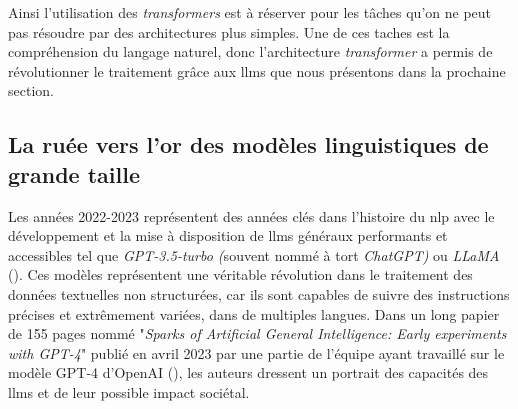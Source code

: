 Ainsi l'utilisation des \textit{transformers} est à réserver pour les tâches qu'on ne peut pas résoudre par des architectures plus simples. Une de ces taches est la compréhension du langage naturel, donc l'architecture \textit{transformer} a permis de révolutionner le traitement grâce aux \gls{llms} que nous présentons dans la prochaine section.

\subsection{La ruée vers l'or des modèles linguistiques de grande taille}
Les années 2022-2023 représentent des années clés dans l’histoire du \gls{nlp} avec le développement et la mise à disposition de \gls{llms} généraux performants et accessibles tel que \textit{GPT-3.5-turbo (}souvent nommé à tort \textit{ChatGPT)} ou \textit{LLaMA} (\cite{touvron_llama_2023}).  Ces modèles représentent une véritable révolution dans le traitement des données textuelles non structurées, car ils sont capables de suivre des instructions précises et extrêmement variées, dans de multiples langues. Dans un long papier de 155 pages nommé "\textit{Sparks of Artificial General Intelligence: Early experiments with GPT-4}" publié en avril 2023 par une partie de l'équipe ayant travaillé sur le modèle GPT-4 d'OpenAI (\cite{bubeck_sparks_2023}), les auteurs dressent un portrait des capacités des \gls{llms} et de leur possible impact sociétal.


